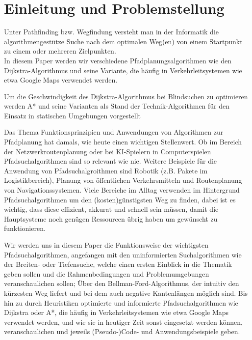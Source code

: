 
\chapter{Einleitung und Problemstellung}
\label{Einleitung und Problemstellung}

Unter Pathfinding bzw. Wegfindung versteht man in der Informatik die algorithmengestütze Suche nach dem optimalen Weg(en) 
von einem Startpunkt zu einem oder mehreren Zielpunkten.\cite{Wikipedia:00a}\\
In diesem Paper werden wir verschiedene Pfadplanungsalgorithmen wie den Dijkstra-Algorithmus und seine Variante, 
die häufig in Verkehrleitsystemen wie etwa Google Maps verwendet werden.

Um die Geschwindigkeit des Dijkstra-Algorithmus bei Blindsuchen zu optimieren werden A* und seine Varianten als Stand der Technik-Algorithmen 
für den Einsatz in statischen Umgebungen vorgestellt \cite{Karur:21}

Das Thema Funktionsprinzipien und Anwendungen von Algorithmen zur Pfadplanung hat damals, wie heute einen wichtigen Stellenwert. 
Ob im Bereich der Netzwerkroutenplanung oder bei KI-Spielern in Computerspielen Pfadsuchalgorithmen sind so relevant wie nie. 
Weitere Beispiele für die Anwendung von Pfadsuchalgroithmen sind Robotik (z.B. Pakete im Logistikbereich), Planung von öffentlichen 
Verkehrsmitteln und Routenplanung von Navigationssystemen. 
Viele Bereiche im Alltag verwenden im Hintergrund Pfadsuchalgorithmen um den (kosten)günstigsten Weg zu finden, dabei ist es wichtig, 
dass diese effizient, akkurat und schnell sein müssen, 
damit die Hauptsysteme noch genügen Ressourcen übrig haben um gewünscht zu funktionieren. \cite{Foeada:21}

Wir werden uns in diesem Paper die Funktionsweise der wichtigsten Pfadsuchalgorithmen, angefangen mit den uninformierten Suchalgorithmen wie der Breiten- oder Tiefensuche, 
welche einen ersten Einblick in die Thematik geben sollen und die Rahmenbedingungen und Problemumgebungen veranschaulichen sollen; 
Über den Bellman-Ford-Algorithmus, der intuitiv den kürzesten Weg liefert und bei dem auch negative Kantenlängen möglich sind.\cite{Mukhlif:20}
Bis hin zu durch Heuristiken optimierte und informierte Pfadsuchalgorithmen wie Dijkstra oder A*, 
die häufig in Verkehrleitsystemen wie etwa Google Maps verwendet werden, und wie sie in heutiger Zeit 
sonst eingesetzt werden können, veranschaulichen und jeweils (Pseudo-)Code- und Anwendungsbeispiele geben.\cite{Russell:10a}
